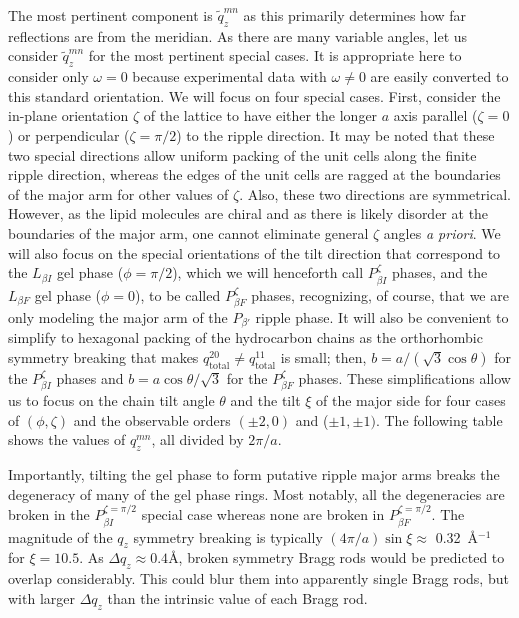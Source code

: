 The most pertinent component is $\tilde{q}_z^{mn}$ as this primarily determines 
how far reflections are from the meridian.  As there are many variable angles, 
let us consider $\tilde{q}_z^{mn}$ for the most pertinent special cases.  It is 
appropriate here to consider only $\omega=0$ because experimental data with 
$\omega\neq 0$ are easily converted to this standard orientation.  We will 
focus on four special cases.  First, consider the in-plane orientation ${\zeta}$ 
of the lattice to have either the longer $a$ axis parallel (${\zeta}=0$) or 
perpendicular (${\zeta}={\pi}/2$) to the ripple direction.  It may be noted 
that these two special directions allow uniform packing of the unit cells along 
the finite ripple direction, whereas the edges of the unit cells are ragged at 
the boundaries of the major arm for other values of ${\zeta}$.  Also, these two 
directions are symmetrical.  However, as the lipid molecules are chiral and as 
there is likely disorder at the boundaries of the major arm, one cannot 
eliminate general ${\zeta}$ angles {\it a priori}.  We will also focus on the 
special orientations of the tilt direction that correspond to the $L_{{\beta}I}$ 
gel phase ($\phi=\pi/2$), which we will henceforth call $P_{{\beta}I}^{\zeta}$ 
phases, and the $L_{{\beta}F}$ gel phase ($\phi=0$), to be called 
$P_{{\beta}F}^{\zeta}$ phases, recognizing, of course, that we are only modeling 
the major arm of the $P_{\beta'}$ ripple phase.   It will also be convenient to 
simplify to hexagonal packing of the hydrocarbon chains as the orthorhombic 
symmetry breaking that makes $q_\text{total}^{20} \neq q_\text{total}^{11}$ is small; 
then, $b=a/(\sqrt{3}\cos{\theta})$ for the $P_{{\beta}I}^{\zeta}$ phases and 
$b=a\cos{\theta}/\sqrt{3}$ for the $P_{{\beta}F}^{\zeta}$ phases.  These 
simplifications allow us to focus on the chain tilt angle $\theta$ and the 
tilt $\xi$ of the major side for four cases of $(\phi,\zeta)$ and the 
observable orders $({\pm}2,0)$ and (${\pm}1,{\pm}1)$.  The following table 
shows the values of $q_z^{mn}$, all divided by $2\pi/a$.  

Importantly, tilting the gel phase to form putative ripple major arms breaks 
the degeneracy of many of the gel phase rings.  Most notably, all the 
degeneracies are broken in the $P_{{\beta}I}^{\zeta=\pi/2}$ special case 
whereas none are broken in $P_{{\beta}F}^{\zeta=\pi/2}$.  The magnitude of the 
$q_z$ symmetry breaking is typically 
$(4{\pi}/a)\sin{\xi} \approx$ 0.32~\AA$^{-1}$  
for $\xi=10.5$\textdegree.  
As ${\Delta}q_z \approx 0.4$\AA, broken symmetry Bragg rods would be predicted 
to overlap considerably.  This could blur them into apparently single Bragg 
rods, but with larger ${\Delta}q_z$ than the intrinsic value of each Bragg rod. 

